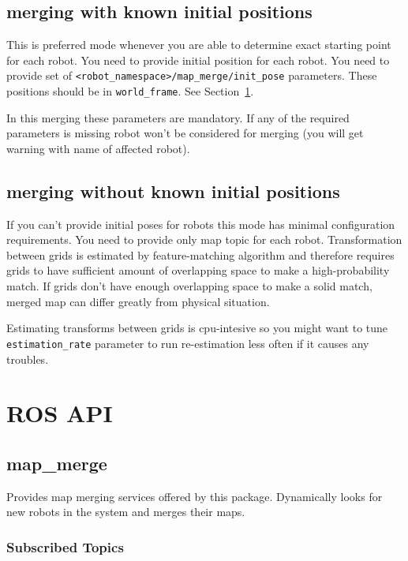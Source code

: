 \subsection{merging with known initial positions}

This is preferred mode whenever you are able to determine exact starting point for each robot. You need to provide initial position for each robot. You need to provide set of \texttt{<robot\_namespace>/map\_merge/init\_pose} parameters. These positions should be in \texttt{world\_frame}. See Section~\ref{sec:rosapi}.

In this merging these parameters are mandatory. If any of the required parameters is missing robot won't be considered for merging (you will get warning with name of affected robot).

\subsection{merging without known initial positions}

If you can't provide initial poses for robots this mode has minimal configuration requirements. You need to provide only map topic for each robot. Transformation between grids is estimated by feature-matching algorithm and therefore requires grids to have sufficient amount of overlapping space to make a high-probability match. If grids don't have enough overlapping space to make a solid match, merged map can differ greatly from physical situation.

Estimating transforms between grids is cpu-intesive so you might want to tune \texttt{estimation\_rate} parameter to run re-estimation less often if it causes any troubles.

\section{ROS API}
\label{sec:rosapi}

\subsection{map\_merge}

Provides map merging services offered by this package. Dynamically looks for new robots in the system and merges their maps.

\subsubsection{Subscribed Topics}

